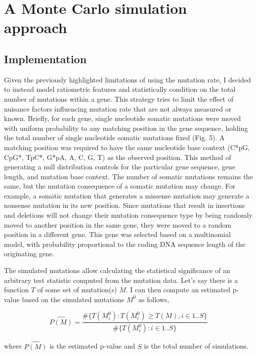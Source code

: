 \section{A Monte Carlo simulation approach}
\label{sec:monte_carlo}

\subsection{Implementation}

Given the previously highlighted limitations of using the mutation rate, I decided to instead model ratiometric features and statistically condition on the total number of mutations within a gene. This strategy tries to limit the effect of nuisance factors influencing mutation rate that are not always measured or known. Briefly, for each gene, single nucleotide somatic mutations were moved with uniform probability to any matching position in the gene sequence, holding the total number of single nucleotide somatic mutations fixed (Fig. 5). A matching position was required to have the same nucleotide base context (C*pG, CpG*, TpC*, G*pA, A, C, G, T) as the observed position. This method of generating a null distribution controls for the particular gene sequence, gene length, and mutation base context. The number of somatic mutations remains the same, but the mutation consequence of a somatic mutation may change. For example, a somatic mutation that generates a missense mutation may generate a nonsense mutation in its new position. Since mutations that result in insertions and deletions will not change their mutation consequence type by being randomly moved to another position in the same gene, they were moved to a random position in a different gene. This gene was selected based on a multinomial model, with probability proportional to the coding DNA sequence length of the originating gene.

The simulated mutations allow calculating the statistical significance of an arbitrary test statistic computed from the mutation data. Let's say there is a function $T$ of some set of mutation(s) $M$. I can then compute an estimated p-value based on the simulated mutations $M^0$ as follows,

\begin{equation}
\widehat{P(M)} = \frac{\#\{T(M^0_i) : T(M^0_i) \geq T(M), i \in 1..S\}}{\#\{T(M^0_i) : i \in 1..S\}}
\end{equation}

where $\widehat{P(M)}$ is the estimated p-value and $S$ is the total number of simulations. 

